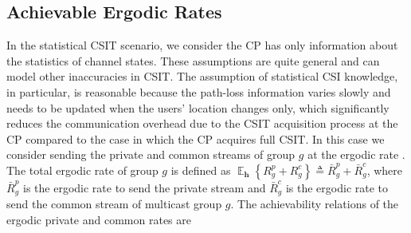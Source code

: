 \documentclass[12pt,draftcls,onecolumn]{IEEEtran}
\theoremstyle{remark}
\DeclareMathOperator{\EX}{\mathbb{E}}%
\theoremstyle{definition}
\begin{document}
{	\subsection{Achievable Ergodic Rates}
	\label{subsec:rec}
	In the statistical CSIT scenario, we consider the CP has only information about the statistics of channel states. %
	These assumptions are quite general and can model other inaccuracies in CSIT. 
	The assumption of statistical CSI knowledge, in particular, is reasonable because the path-loss information varies slowly and needs to be updated when the users' location changes only, which significantly reduces the communication overhead due to the CSIT acquisition process at the CP compared to the case in which the CP acquires full CSIT.
	In this case we consider sending the private and common streams of group $g$ at the ergodic rate \cite{goldsmith_2005}. The total ergodic rate of group $g$ is defined as $\EX_{\mathbf{h}}\left\lbrace R_{g}^{p} + R_{g}^{c} \right\rbrace \triangleq \bar{R}_{g}^{p} + \bar{R}_{g}^{c}$, where $\bar{R}_{g}^{p}$ is the ergodic rate to send the private stream and $\bar{R}_{g}^{c}$ is the ergodic rate to send the common stream of multicast group $g$. The achievability relations of the ergodic private and common rates are 
}
\end{document}
